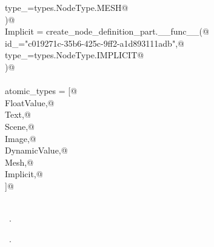 \documentclass[
    a4paper,      %
    10pt,         %
    openright,    %
    notitlepage,  %
    parskip=half, %
]{scrreprt}       %
\theoremstyle{definition}                    %
\begin{document}
\begin{flushleft}
\begin{minipage}{\linewidth}
\begin{list}{}{}
\mbox{}\lstinline@        type_=types.NodeType.MESH@\\
\mbox{}\lstinline@    )@\\
\mbox{}\lstinline@    Implicit = create_node_definition_part.__func__(@\\
\mbox{}\lstinline@        id_="c019271c-35b6-425c-9ff2-a1d893111adb",@\\
\mbox{}\lstinline@        type_=types.NodeType.IMPLICIT@\\
\mbox{}\lstinline@    )@\\
\mbox{}\lstinline@@\\
\mbox{}\lstinline@    atomic_types = [@\\
\mbox{}\lstinline@        FloatValue,@\\
\mbox{}\lstinline@        Text,@\\
\mbox{}\lstinline@        Scene,@\\
\mbox{}\lstinline@        Image,@\\
\mbox{}\lstinline@        DynamicValue,@\\
\mbox{}\lstinline@        Mesh,@\\
\mbox{}\lstinline@        Implicit,@\\
\mbox{}\lstinline@    ]@\\
\mbox{}\lstinline@@\\
\mbox{}\lstinline@@{\NWsep}
\end{list}
\vspace{-1.5ex}
\footnotesize
\begin{list}{}{\setlength{\itemsep}{-\parsep}\setlength{\itemindent}{-\leftmargin}}
\item \NWtxtMacroDefBy\ .
\item \NWtxtMacroRefIn\ .

\item{}
\end{list}
\end{minipage}\vspace{4ex}
\end{flushleft}
\end{document}
